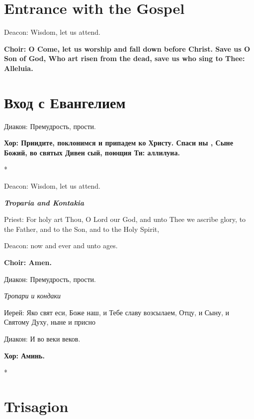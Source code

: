 \documentclass[12pt,a4paper,titlepage]{report}
\begin{document}
\begin{paracol}[1]{2}
  \section*{Entrance with the Gospel}

  Deacon: Wisdom, let us attend.

  \textbf{Choir: O Come, let us worship and fall down before Christ. Save us O Son of God, Who art risen from the dead, save us who sing to Thee: Alleluia.}

  \switchcolumn[1]

  \section*{Вход с Евангелием}

  Диакон: Премудрость, прости.

  \textbf{Хор: Приидите, поклонимся и припадем ко Христу. Спаси ны , Сыне Божий, во святых Дивен сый, поющия Ти: аллилуиа.}

  \switchcolumn[0]*

  Deacon: Wisdom, let us attend.

  \medskip
  \textit{\textbf{Troparia and Kontakia}}
  \medskip

  Priest: For holy art Thou, O Lord our God, and unto Thee we ascribe glory, to the Father, and to the Son, and to the Holy Spirit,

  Deacon: now and ever and unto ages.

  \textbf{Choir: Amen.}

  \switchcolumn[1]

  Диакон: Премудрость, прости.

  \medskip
  \textit{Тропари и кондаки}
  \medskip

  Иерей: Яко свят еси, Боже наш, и Тебе славу возсылаем, Отцу, и Сыну, и Святому Духу, ныне и присно

  Диакон: И во веки веков.

  \textbf{Хор: Аминь.}

  \switchcolumn[0]*

  \section*{Trisagion}


\end{paracol}
\end{document}
